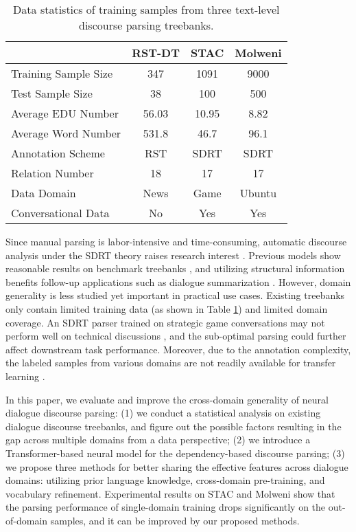 \documentclass[11pt]{article}
\begin{document}
\begin{table}[t!]
\linespread{1.0}
    \centering
    \small
    \begin{tabular}{p{2.9cm}ccc}
    \toprule
        & \textbf{RST-DT} & \textbf{STAC} & \textbf{Molweni} \\
    \midrule
         Training Sample Size & 347 & 1091 & 9000 \\
         Test Sample Size & 38 & 100 & 500 \\
         Average EDU Number & 56.03 & 10.95 & 8.82 \\
         Average Word Number & 531.8 & 46.7 & 96.1 \\
         Annotation Scheme & RST & SDRT  & SDRT \\
         Relation Number & 18 & 17 & 17 \\
         Data Domain & News & Game & Ubuntu \\
         Conversational Data & No & Yes & Yes \\
    \bottomrule
    \end{tabular}
    \caption{Data statistics of training samples from three text-level discourse parsing treebanks.}
    \label{tab:dataset}
\vspace{-0.2cm}
\end{table}

Since manual parsing is labor-intensive and time-consuming, automatic discourse analysis under the SDRT theory raises research interest \cite{badene2019weakSupervision}. Previous models show reasonable results on benchmark treebanks \cite{shi2019deepSeqParser}, and utilizing structural information benefits follow-up applications such as dialogue summarization \cite{feng2020-DDAGCN}.
However, domain generality is less studied yet important in practical use cases. Existing treebanks only contain limited training data (as shown in Table \ref{tab:dataset}) and limited domain coverage. An SDRT parser trained on strategic game conversations \cite{asher2016STAC} may not perform well on technical discussions \cite{li2020molweni}, and the sub-optimal parsing could further affect downstream task performance.  Moreover, due to the annotation complexity, the labeled samples from various domains are not readily available for transfer learning \cite{yu2019transfer}.

In this paper, we evaluate and improve the cross-domain generality of neural dialogue discourse parsing:
(1) we conduct a statistical analysis on existing dialogue discourse treebanks, and figure out the possible factors resulting in the gap across multiple domains from a data perspective;
(2) we introduce a Transformer-based neural model for the dependency-based discourse parsing;
(3) we propose three methods for better sharing the effective features across dialogue domains: utilizing prior language knowledge, cross-domain pre-training, and vocabulary refinement. Experimental results on STAC \cite{asher2016STAC} and Molweni \cite{li2020molweni} show that the parsing performance of single-domain training drops significantly on the out-of-domain samples, and it can be improved by our proposed methods.
\end{document}

